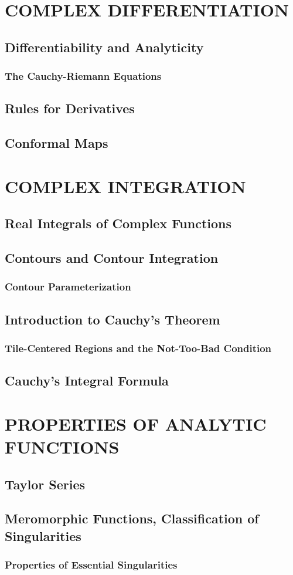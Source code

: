 \documentclass[hidelinks,12pt]{article}
\theoremstyle{definition}
\begin{document}
  \section{COMPLEX DIFFERENTIATION}
  \subsection{Differentiability and Analyticity}
  \subsubsection{The Cauchy-Riemann Equations}
  \subsection{Rules for Derivatives}
  \subsection{Conformal Maps}


  \section{COMPLEX INTEGRATION}
  \subsection{Real Integrals of Complex Functions}
  \subsection{Contours and Contour Integration}
  \subsubsection{Contour Parameterization}
  \subsection{Introduction to Cauchy's Theorem}
  \subsubsection{Tile-Centered Regions and the Not-Too-Bad Condition}
  \subsection{Cauchy's Integral Formula}

  \section{PROPERTIES OF ANALYTIC FUNCTIONS}
  \subsection{Taylor Series}
  \subsection{Meromorphic Functions, Classification of Singularities}
  \subsubsection{Properties of Essential Singularities}
\end{document}
